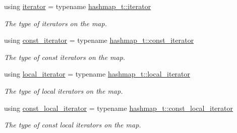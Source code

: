 \begin{DoxyCompactItemize}
using \hyperlink{group__Types_gab52d604c26835c20a0363f9affa7ff57}{iterator} = typename \hyperlink{classshad_1_1Hashmap_a4603e48d3ad3a380abc888671e55bf01}{hashmap\-\_\-t\-::iterator}
\begin{DoxyCompactList}\small\item\em The type of iterators on the map. \end{DoxyCompactList}\item 
using \hyperlink{group__Types_ga102c3cd521767bf4b22f3788ccc054e8}{const\-\_\-iterator} = typename \hyperlink{classshad_1_1Hashmap_a1f8a379c42bc2d4b67dcc9f519dc537e}{hashmap\-\_\-t\-::const\-\_\-iterator}
\begin{DoxyCompactList}\small\item\em The type of const iterators on the map. \end{DoxyCompactList}\item 
using \hyperlink{group__Types_ga520d395c30b2b19179153108ea694cec}{local\-\_\-iterator} = typename \hyperlink{classshad_1_1Hashmap_abf95d16be9ba9060bff9fa591ece302f}{hashmap\-\_\-t\-::local\-\_\-iterator}
\begin{DoxyCompactList}\small\item\em The type of local iterators on the map. \end{DoxyCompactList}\item 
using \hyperlink{group__Types_ga2242fb2071462a5f8a420d8cd8a7d8e8}{const\-\_\-local\-\_\-iterator} = typename \hyperlink{classshad_1_1Hashmap_afdf2dad495223a7d8bcec4256b591d89}{hashmap\-\_\-t\-::const\-\_\-local\-\_\-iterator}
\begin{DoxyCompactList}\small\item\em The type of const local iterators on the map. \end{DoxyCompactList}\end{DoxyCompactItemize}
